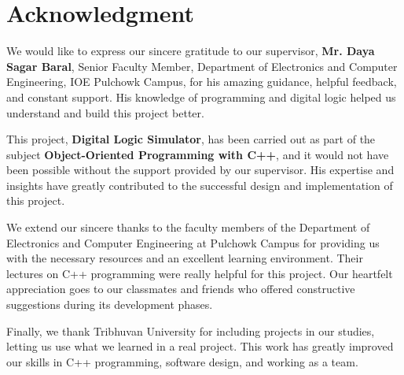 \section*{Acknowledgment}

We would like to express our sincere gratitude to our supervisor, \textbf{Mr. Daya Sagar Baral}, Senior Faculty Member, Department of Electronics and Computer Engineering, IOE Pulchowk Campus, for his amazing guidance, helpful feedback, and constant support. His knowledge of programming and digital logic helped us understand and build this project better.

\vspace{0.5cm}
This project, \textbf{Digital Logic Simulator}, has been carried out as part of the subject \textbf{Object-Oriented Programming with C++}, and it would not have been possible without the support provided by our supervisor. His expertise and insights have greatly contributed to the successful design and implementation of this project.

\vspace{0.5cm}
We extend our sincere thanks to the faculty members of the Department of Electronics and Computer Engineering at Pulchowk Campus for providing us with the necessary resources and an excellent learning environment. Their lectures on C++ programming were really helpful for this project. Our heartfelt appreciation goes to our classmates and friends who offered constructive suggestions during its development phases.

\vspace{0.5cm}
Finally, we thank Tribhuvan University for including projects in our studies, letting us use what we learned in a real project. This work has greatly improved our skills in C++ programming, software design, and working as a team.
\clearpage